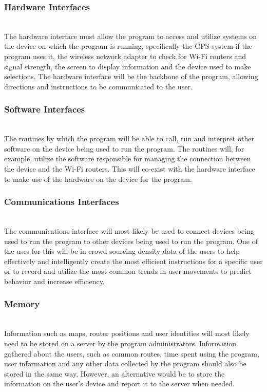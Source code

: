 \documentclass[a4paper,10pt]{article}
\begin{document}
		\subsubsection{Hardware Interfaces}
			\\The hardware interface must allow the program to access and utilize systems on the device on which the program 			is running, specifically the GPS system if the program uses it, the wireless network adapter to check for Wi-Fi 			routers and signal strength, the screen to display information and the device used to make selections. The 				hardware interface will be the backbone of the program, allowing directions and instructions to be communicated 			to the user.\\
		\subsubsection{Software Interfaces}
			\\The routines by which the program will be able to call, run and interpret other software on the device being 				used to run the program. The routines will, for example, utilize the software responsible for managing the 				connection between the device and the Wi-Fi routers. This will co-exist with the hardware interface to make use 			of the hardware on the device for the program.\\
		\subsubsection{Communications Interfaces}
			\\The communications interface will most likely be used to connect devices being used to run the program to 				other devices being used to run the program. One of the uses for this will be in crowd sourcing density data of 			the users to help effectively and intelligently create the most efficient instructions for a specific user or to 			record and utilize the most common trends in user movements to predict behavior and increase efficiency.\\
		\subsubsection{Memory}
			\\Information such as maps, router positions and user identities will most likely need to be stored on a server 			by the program administrators. Information gathered about the users, such as common routes, time spent using the 			program, user information and any other data collected by the program should also be stored in the same way. 				However, an alternative would be to store the information on the user’s device and report it to the server when 			needed.\\   
\end{document}
